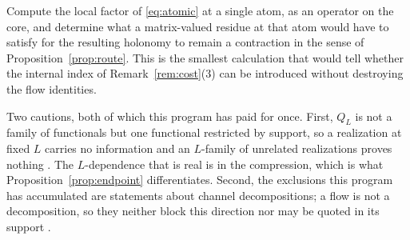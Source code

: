 \begin{problem}\label{prob:curvature}
Compute the local factor of \eqref{eq:atomic} at a single atom, as an operator on
the core, and determine what a matrix-valued residue at that atom would have to
satisfy for the resulting holonomy to remain a contraction in the sense of
Proposition~\ref{prop:route}. This is the smallest calculation that would tell
whether the internal index of Remark~\ref{rem:cost}(3) can be introduced without
destroying the flow identities.
\end{problem}

\begin{remark}\label{rem:not-a-family}
Two cautions, both of which this program has paid for once. First, $Q_L$ is not a
family of functionals but one functional restricted by support, so a realization
at fixed $L$ carries no information and an $L$-family of unrelated realizations
proves nothing \cite{InverseBulk}. The $L$-dependence that is real is in the
compression, which is what Proposition~\ref{prop:endpoint} differentiates.
Second, the exclusions this program has accumulated are statements about channel
decompositions; a flow is not a decomposition, so they neither block this
direction nor may be quoted in its support \cite{ExclusionMap}.
\end{remark}
